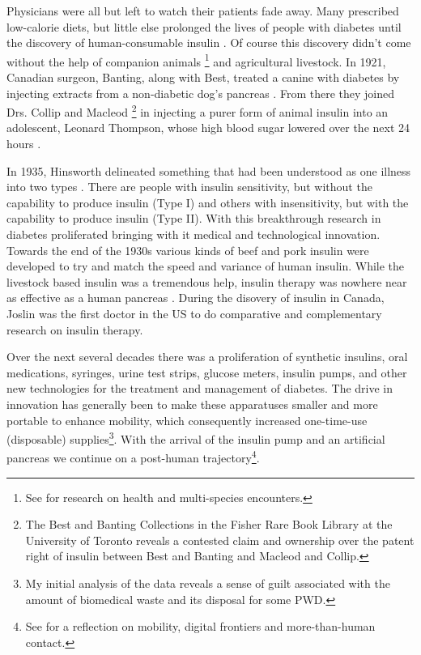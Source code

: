 \documentclass[12pt]{article}
\begin{document}
Physicians were all but left to watch their patients fade away. Many prescribed low-calorie diets, but little else prolonged the lives of people with diabetes until the discovery of human-consumable insulin \citep{ebstein_history_1989}. Of course this discovery didn't come without the help of companion animals \citep{balfe_diabetes_2008}\footnote{See \citet{wilkie_multispecies_2013} for research on health and multi-species encounters.} and agricultural livestock. In 1921, Canadian surgeon, Banting, along with Best, treated a canine with diabetes by injecting extracts from a non-diabetic dog's pancreas \citep{zimmermann_first_1989}. From there they joined Drs. Collip and Macleod \footnote{The Best and Banting Collections in the Fisher Rare Book Library at the University of Toronto reveals a contested claim and ownership over the patent right of insulin between Best and Banting and Macleod and Collip.} in injecting a purer form of animal insulin into an adolescent, Leonard Thompson, whose high blood sugar lowered over the next 24 hours \citep{sattley_history_1996}.  

In 1935, Hinsworth delineated something that had been understood as one illness into two types \citep{sattley_history_1996}. There are people with insulin sensitivity, but without the capability to produce insulin (Type I) and others with insensitivity, but with the capability to produce insulin (Type II).  With this breakthrough research in diabetes proliferated bringing with it medical and technological innovation. Towards the end of the 1930s various kinds of beef and pork insulin were developed to try and match the speed and variance of human insulin. While the livestock based insulin was a tremendous help, insulin therapy was nowhere near as effective as a human pancreas \citep{sattley_history_1996}. During the disovery of insulin in Canada, Joslin was the first doctor in the US to do comparative and complementary research on insulin therapy.


Over the next several decades there was a proliferation of synthetic insulins, oral medications, syringes, urine test strips, glucose meters, insulin pumps, and other new technologies \citep{phillip_attd_2012} for the treatment and management of diabetes. The drive in innovation has generally been to make these apparatuses smaller and more portable to enhance mobility, which consequently increased one-time-use (disposable) supplies\footnote{My initial analysis of the data reveals a sense of guilt associated with the amount of biomedical waste and its disposal for some PWD.}. With the arrival of the insulin pump and an artificial pancreas we continue on a post-human trajectory\footnote{See \citet{wilson_more_2011} for a reflection on mobility, digital frontiers and more-than-human contact.}.  
\end{document}
